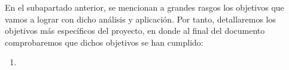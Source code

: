 
En el subapartado anterior, se mencionan a grandes rasgos los objetivos que vamos a lograr con dicho análisis y aplicación. Por tanto, detallaremos los objetivos más específicos del proyecto, en donde al final del documento comprobaremos que dichos objetivos se han cumplido:

\begin{enumerate}
	
	\item 
	
	
	
	
	
	
	
	

\end{enumerate}


